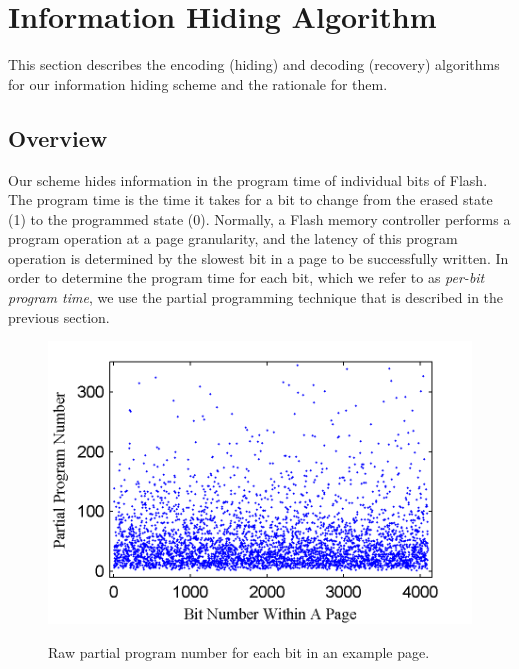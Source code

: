 \section{Information Hiding Algorithm}
\label{sec:scheme}

This section describes the encoding (hiding) and decoding (recovery) algorithms 
for our information hiding scheme and the rationale for them. 

\subsection{Overview}

Our scheme hides information in the program time of
individual bits of Flash. The program time is the time it takes 
for a bit to change from the erased state (1) to the programmed state (0).
Normally, a Flash memory controller performs a program operation
at a page granularity, and the latency of this program operation is
determined by the slowest bit in a page to be successfully written.
In order to determine the program time for each bit, 
which we refer to as {\em per-bit program time}, we use the partial
programming technique that is described in the previous section.

\begin{figure} 
\begin{center} 
\includegraphics[width=\mywidth]{figs/program_numbers_c1_5e3pe_block1_page0.png} 
\caption{Raw partial program number for each bit in an example page.}
\vspace{-0.1in}
\label{fig:ptimeraw} 
\end{center} 
\end{figure} 

